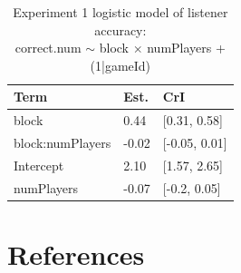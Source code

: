 \documentclass[
  english,
  a4paper,
]{article}
\begin{document}
\begin{table}

\caption{\label{tab:unnamed-chunk-17}Experiment 1 logistic model of listener accuracy:\\ correct.num $\sim$ block $\times$ numPlayers + (1|gameId)}
\centering
\begin{tabular}[t]{l|l|l}
\hline
Term & Est. & CrI\\
\hline
block & 0.44 & [0.31, 0.58]\\
\hline
block:numPlayers & -0.02 & [-0.05, 0.01]\\
\hline
Intercept & 2.10 & [1.57, 2.65]\\
\hline
numPlayers & -0.07 & [-0.2, 0.05]\\
\hline
\end{tabular}
\end{table}

\hypertarget{references}{%
\section{References}\label{references}}

\setlength{\parindent}{-0.1in} 
\setlength{\leftskip}{0.125in}

\noindent
\end{document}
